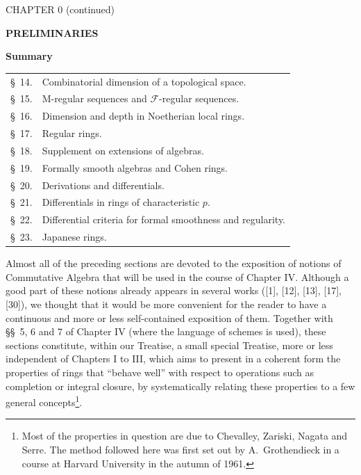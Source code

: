 \clearpage
\thispagestyle{plain}
\label{chapter:0IV1}

\begin{center}
{\large CHAPTER 0 (continued)\footnotemark\par}
\vspace{1.5em}
{\Large\bfseries PRELIMINARIES\par}
\vspace{2em}
{\large\bfseries Summary\par}
\end{center}


\begin{center}
\begin{tabular}{@{}r l@{}}
\S~14. & Combinatorial dimension of a topological space.\\
\S~15. & M-regular sequences and $\mathscr F$-regular sequences.\\
\S~16. & Dimension and depth in Noetherian local rings.\\
\S~17. & Regular rings.\\
\S~18. & Supplement on extensions of algebras.\\
\S~19. & Formally smooth algebras and Cohen rings.\\
\S~20. & Derivations and differentials.\\
\S~21. & Differentials in rings of characteristic $p$.\\
\S~22. & Differential criteria for formal smoothness and regularity.\\
\S~23. & Japanese rings.
\end{tabular}
\end{center}

Almost all of the preceding sections are devoted to the exposition of
notions of Commutative Algebra that will be used in the course of Chapter IV.
Although a good part of these notions already appears in several works
([1], [12], [13], [17], [30]), we thought that it would be more convenient for the
reader to have a continuous and more or less self-contained exposition of them.
Together with \S\S~5, 6 and 7 of Chapter IV (where the language of schemes is
used), these sections constitute, within our Treatise, a small special
Treatise, more or less independent of Chapters I to III, which aims to present
in a coherent form the properties of rings that ``behave well''
with respect to operations such as completion or integral
closure, by systematically relating these properties to a few
general concepts\footnote{Most of the properties in question are due to Chevalley, Zariski, Nagata and Serre. The method followed here was first set out by A.~Grothendieck in a course at Harvard University in the autumn of 1961.}.

